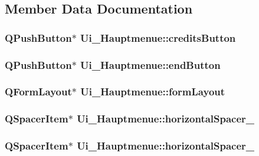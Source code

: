 \subsection{Member Data Documentation}
\hypertarget{classUi__Hauptmenue_a177bc94a75741e57bed020238f6ac3d5}{
\subsubsection[{credits\-Button}]{\setlength{\rightskip}{0pt plus 5cm}Q\-Push\-Button$\ast$ Ui\-\_\-\-Hauptmenue\-::credits\-Button}}\label{classUi__Hauptmenue_a177bc94a75741e57bed020238f6ac3d5}
\hypertarget{classUi__Hauptmenue_a8708beaede0fa073362609aee0ef02a5}{
\subsubsection[{end\-Button}]{\setlength{\rightskip}{0pt plus 5cm}Q\-Push\-Button$\ast$ Ui\-\_\-\-Hauptmenue\-::end\-Button}}\label{classUi__Hauptmenue_a8708beaede0fa073362609aee0ef02a5}
\hypertarget{classUi__Hauptmenue_a85ff61d607b0597303197bd0d3761046}{
\subsubsection[{form\-Layout}]{\setlength{\rightskip}{0pt plus 5cm}Q\-Form\-Layout$\ast$ Ui\-\_\-\-Hauptmenue\-::form\-Layout}}\label{classUi__Hauptmenue_a85ff61d607b0597303197bd0d3761046}
\hypertarget{classUi__Hauptmenue_a12dac364a3e6ecd5e8a4c686a2c19ff8}{
\subsubsection[{horizontal\-Spacer\-\_\-14}]{\setlength{\rightskip}{0pt plus 5cm}Q\-Spacer\-Item$\ast$ Ui\-\_\-\-Hauptmenue\-::horizontal\-Spacer\-\_}}\label{classUi__Hauptmenue_a12dac364a3e6ecd5e8a4c686a2c19ff8}
\hypertarget{classUi__Hauptmenue_a5966eee0a1f08411c3437e41000a5a67}{
\subsubsection[{horizontal\-Spacer\-\_\-8}]{\setlength{\rightskip}{0pt plus 5cm}Q\-Spacer\-Item$\ast$ Ui\-\_\-\-Hauptmenue\-::horizontal\-Spacer\-\_}}\label{classUi__Hauptmenue_a5966eee0a1f08411c3437e41000a5a67}
